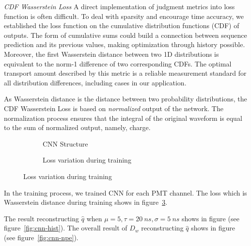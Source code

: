 \emph{CDF Wasserstein Loss}
A direct implementation of judgment metrics into loss function is often difficult. To deal with sparsity and encourage time accuracy, we established the loss function on the cumulative distribution functions (CDF) of outputs. The form of cumulative sums could build a connection between sequence prediction and its previous values, making optimization through history possible. Moreover, the first Wasserstein distance between two 1D distributions is equivalent to the norm-1 difference of two corresponding CDFs. The optimal transport amount described by this metric is a reliable measurement standard for all distribution differences, including cases in our application. 

As Wasserstein distance is the distance between two probability distributions, the CDF Wasserstein Loss is based on \emph{normalized} output of the network. The normalization process ensures that the integral of the original waveform is equal to the sum of normalized output, namely, charge. 

\begin{figure}[H]
\begin{minipage}[b]{.4\textwidth}
\begin{figure}[H]
    \begin{center}
    \begin{adjustbox}{width=0.6\textwidth}
        
    \end{adjustbox}
    \end{center}
    \caption{\label{fig:struct} CNN Structure}
\end{figure}
\end{minipage}
\begin{minipage}[b]{.6\textwidth}
\begin{figure}[H]
    \centering
    \resizebox{\textwidth}{!}{}
    \caption{\label{fig:loss} Loss variation during training}
\end{figure}
\end{minipage}
\end{figure}

In the training process, we trained CNN for each PMT channel. The loss which is Wasserstein distance during training shows in figure~\ref{fig:loss}. 

The result reconstructing $\hat{q}$ when $\mu=5, \tau=\SI{20}{ns}, \sigma=\SI{5}{ns}$ shows in figure (see figure~\ref{fig:cnn-hist}). The overall result of $D_w$ reconstructing $\hat{q}$ shows in figure (see figure~\ref{fig:cnn-npe}). 

